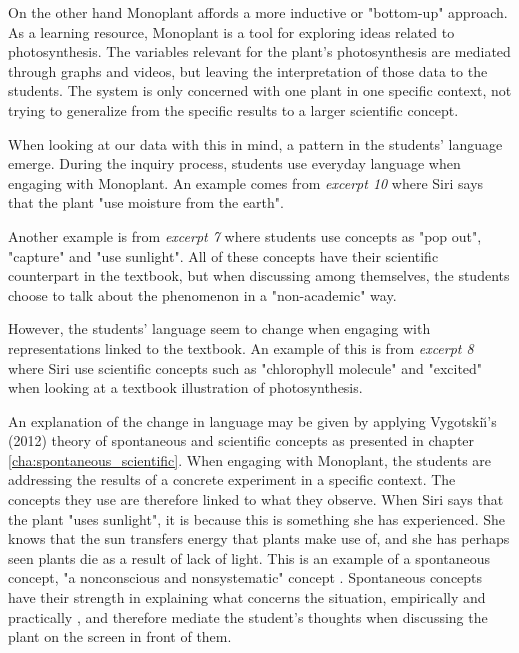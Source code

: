 On the other hand Monoplant affords a more inductive or "bottom-up" approach. As a learning resource, Monoplant is a tool for exploring ideas related to photosynthesis. The variables relevant for the plant's photosynthesis are mediated through graphs and videos, but leaving the interpretation of those data to the students. The system is only concerned with one plant in one specific context, not trying to generalize from the specific results to a larger scientific concept. 

When looking at our data with this in mind, a pattern in the students' language emerge. During the inquiry process, students use everyday language when engaging with Monoplant. An example comes from \emph{excerpt 10} where Siri says that the plant "use moisture from the earth". 

Another example is from \emph{excerpt 7} where students use concepts as "pop out", "capture" and "use sunlight". All of these concepts have their scientific counterpart in the textbook, but when discussing among themselves, the students choose to talk about the phenomenon in a "non-academic" way. 

However, the students' language seem to change when engaging with representations linked to the textbook. An example of this is from \emph{excerpt 8} where Siri use scientific concepts such as "chlorophyll molecule" and "excited" when looking at a textbook illustration of photosynthesis. 

An explanation of the change in language may be given by applying Vygotski{\u\i}'s (2012) theory of spontaneous and scientific concepts as presented in chapter \ref{cha:spontaneous_scientific}. When engaging with Monoplant, the students are addressing the results of a concrete experiment in a specific context. The concepts they use are therefore linked to what they observe. When Siri says that the plant "uses sunlight", it is because this is something she has experienced. She knows that the sun transfers energy that plants make use of, and she has perhaps seen plants die as a result of lack of light. This is an example of a spontaneous concept, "a nonconscious and nonsystematic" concept \citep{vygotsky2012thought}. Spontaneous concepts have their strength in explaining what concerns the situation, empirically and practically \citep{vygotsky2012thought}, and  therefore mediate the student's thoughts when discussing the plant on the screen in front of them. 


